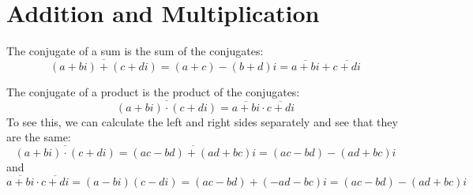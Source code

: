 \documentclass[handout]{ximera}
\begin{document}
\section{Addition and Multiplication}

The conjugate of a sum is the sum of the conjugates:
\[
\overline{(a+bi) + (c+di)} = (a+c) - (b+d)i = \overline{a+bi }+\overline{c+di}
\]


The conjugate of a product is the product of the conjugates:
\[
\overline{(a+bi) \cdot (c+di)} = \overline{a+bi }\cdot\overline{c+di}
\]
To see this, we can calculate the left and right sides separately and see that they are the same:
\[
\overline{(a+bi) \cdot (c+di)}= \overline{(ac-bd) + (ad+bc)i} = (ac-bd) - (ad+bc)i
\]
and
\[
\overline{a+bi }\cdot\overline{c+di} = (a-bi)(c-di) = (ac-bd) + (-ad-bc)i = (ac-bd) - (ad +bc)i
\]
\end{document}
